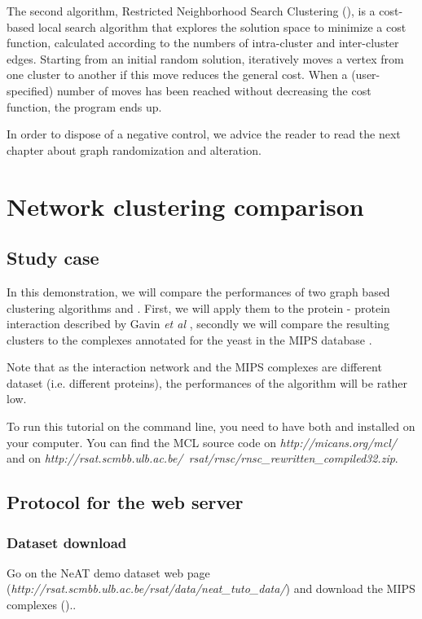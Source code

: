 The second algorithm, Restricted Neighborhood Search Clustering (), 
is a cost-based local search
algorithm that explores the solution space to minimize a cost
function, calculated according to the numbers of intra-cluster and
inter-cluster edges. Starting from an initial random solution, 
iteratively moves a vertex from one cluster to another if this
move reduces the general cost. When a (user-specified) number of moves
has been reached without decreasing the cost function, the program
ends up.

In order to dispose of a negative control, we advice the reader to read the next chapter about graph randomization and alteration. 

\section{Network clustering comparison}
\subsection{Study case}

In this demonstration, we will compare the performances of two graph based clustering algorithms
 and . First, we will apply them to the protein - protein interaction described by Gavin \textit{et al} \cite{Gavin2006}, secondly we will compare the resulting clusters to the complexes annotated for the yeast in the MIPS database \cite{Mewes2007}.

Note that as the 
interaction network and the MIPS complexes are different dataset (i.e. different proteins), the performances of the algorithm
will be rather low.

To run this tutorial on the command line, you need to have both  and  installed on your computer. You can find the MCL source code on \textit{http://micans.org/mcl/} and  on \textit{http://rsat.scmbb.ulb.ac.be/~rsat/rnsc/rnsc\_rewritten\_compiled32.zip}. 

\subsection{Protocol for the web server}

\subsubsection{Dataset download}
Go on the NeAT demo dataset web page (\textit{http://rsat.scmbb.ulb.ac.be/rsat/data/neat\_tuto\_data/}) and download the MIPS complexes ()..

